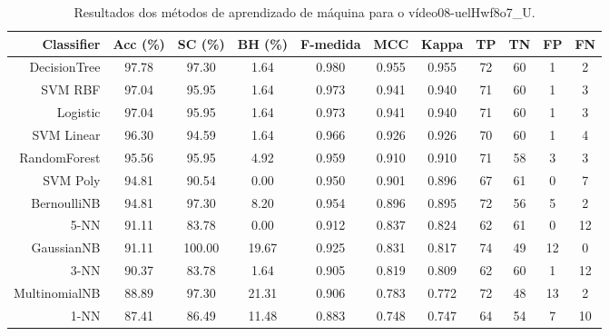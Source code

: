 \begin{table}[!htb]
\centering
\caption{Resultados dos métodos de aprendizado de máquina para o vídeo08-uelHwf8o7_U.}
\label{tab:08-uelHwf8o7_U}
\begin{tabular}{r|c|c|c|c|c|c|c|c|c|c}
\hline\hline
Classifier & Acc (\%) & SC (\%) & BH (\%) & F-medida & MCC & Kappa & TP & TN & FP & FN \\ \hline
DecisionTree & 97.78 & 97.30 & 1.64 & 0.980 & 0.955 & 0.955 & 72 & 60 & 1 & 2 \\ 
SVM RBF & 97.04 & 95.95 & 1.64 & 0.973 & 0.941 & 0.940 & 71 & 60 & 1 & 3 \\ 
Logistic & 97.04 & 95.95 & 1.64 & 0.973 & 0.941 & 0.940 & 71 & 60 & 1 & 3 \\ 
SVM Linear & 96.30 & 94.59 & 1.64 & 0.966 & 0.926 & 0.926 & 70 & 60 & 1 & 4 \\ 
RandomForest & 95.56 & 95.95 & 4.92 & 0.959 & 0.910 & 0.910 & 71 & 58 & 3 & 3 \\ 
SVM Poly & 94.81 & 90.54 & 0.00 & 0.950 & 0.901 & 0.896 & 67 & 61 & 0 & 7 \\ 
BernoulliNB & 94.81 & 97.30 & 8.20 & 0.954 & 0.896 & 0.895 & 72 & 56 & 5 & 2 \\ 
5-NN & 91.11 & 83.78 & 0.00 & 0.912 & 0.837 & 0.824 & 62 & 61 & 0 & 12 \\ 
GaussianNB & 91.11 & 100.00 & 19.67 & 0.925 & 0.831 & 0.817 & 74 & 49 & 12 & 0 \\ 
3-NN & 90.37 & 83.78 & 1.64 & 0.905 & 0.819 & 0.809 & 62 & 60 & 1 & 12 \\ 
MultinomialNB & 88.89 & 97.30 & 21.31 & 0.906 & 0.783 & 0.772 & 72 & 48 & 13 & 2 \\ 
1-NN & 87.41 & 86.49 & 11.48 & 0.883 & 0.748 & 0.747 & 64 & 54 & 7 & 10 \\ 
\hline\hline
\end{tabular}
\end{table}

